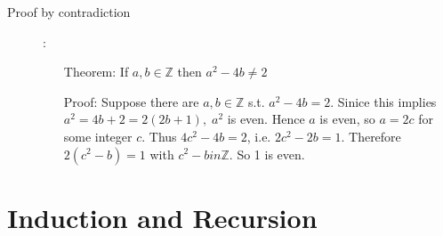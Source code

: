 \documentclass[12pt]{article}
\begin{document}
\begin{description}
\item[Proof by contradiction]:
\begin{enumerate}
\item[Theorem:] If $a,b \in \mathbb{Z}$ then $a^2 - 4b \neq 2$

\item[Proof:] Suppose there are $a,b \in \mathbb{Z}$ s.t. $a^2 - 4b = 2$. Sinice this implies $a^2 = 4b +2 = 2(2b + 1), \; a^2$ is even. Hence $a$ is even, so $a = 2c$ for some integer $c$. Thus $4c^2 - 4b = 2$, i.e. $2c^2 -2b = 1$. Therefore $2(c^2 - b) = 1$ with $c^2 -b in \mathbb{Z}$. So 1 is even.

\end{enumerate}
\end{description}

\section{Induction and Recursion}
\end{document}
